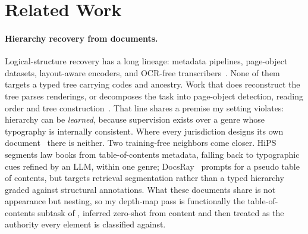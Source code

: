 \section{Related Work}
\label{sec:related}

\paragraph{Hierarchy recovery from documents.} Logical-structure recovery has a
long lineage: metadata pipelines, page-object datasets, layout-aware encoders,
and OCR-free
transcribers~\citep{lopez2009grobid,zhong2019publaynet,xu2020layoutlm,huang2022layoutlmv3,kim2022donut,blecher2023nougat}.
None of them targets a typed tree carrying codes and ancestry. Work that does
reconstruct the tree parses renderings, or decomposes the task into page-object
detection, reading order and tree
construction~\citep{rausch2021docparser,ma2023hrdoc,wang2024detect,wang2025unihdsa,xing2024dochienet}.
That line shares a premise my setting violates: hierarchy can be
\emph{learned}, because supervision exists over a genre whose typography is
internally consistent. Where every jurisdiction designs its own
document~\citep{ncecqa_elgs} there is neither. Two training-free neighbors
come closer. HiPS~\citep{wehnert2025hips} segments law books from
table-of-contents metadata, falling back to typographic cues refined by an LLM,
within one genre; DocsRay~\citep{jeong2025docsray} prompts for a pseudo table
of contents, but targets retrieval segmentation rather than a typed hierarchy
graded against structural annotations. What these documents share is not
appearance but nesting, so my depth-map pass is functionally the
table-of-contents subtask of \citet{wang2024detect}, inferred zero-shot from
content and then treated as the authority every element is classified against.

